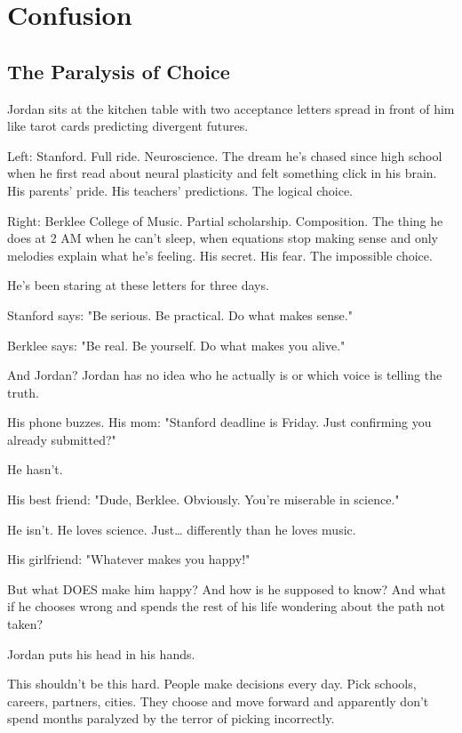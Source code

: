 \documentclass[11pt,twoside]{book}
\begin{document}
\chapter{Confusion}

\section*{The Paralysis of Choice}

Jordan sits at the kitchen table with two acceptance letters spread in front of him like tarot cards predicting divergent futures.

Left: Stanford. Full ride. Neuroscience. The dream he's chased since high school when he first read about neural plasticity and felt something click in his brain. His parents' pride. His teachers' predictions. The logical choice.

Right: Berklee College of Music. Partial scholarship. Composition. The thing he does at 2 AM when he can't sleep, when equations stop making sense and only melodies explain what he's feeling. His secret. His fear. The impossible choice.

He's been staring at these letters for three days.

Stanford says: "Be serious. Be practical. Do what makes sense."

Berklee says: "Be real. Be yourself. Do what makes you alive."

And Jordan? Jordan has no idea who he actually is or which voice is telling the truth.

His phone buzzes. His mom: "Stanford deadline is Friday. Just confirming you already submitted?"

He hasn't.

His best friend: "Dude, Berklee. Obviously. You're miserable in science."

He isn't. He loves science. Just\ldots{} differently than he loves music.

His girlfriend: "Whatever makes you happy!"

But what DOES make him happy? And how is he supposed to know? And what if he chooses wrong and spends the rest of his life wondering about the path not taken?

Jordan puts his head in his hands.

This shouldn't be this hard. People make decisions every day. Pick schools, careers, partners, cities. They choose and move forward and apparently don't spend months paralyzed by the terror of picking incorrectly.
\end{document}
